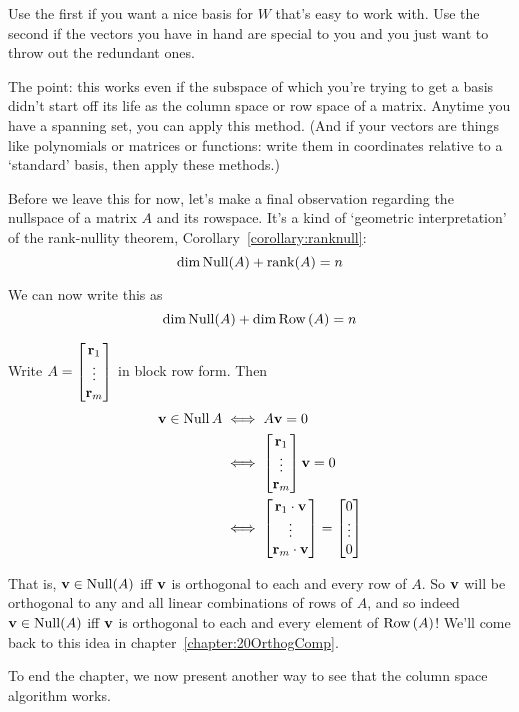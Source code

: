 Use the first
if you want a nice basis for $W$ that's easy to work with.
Use the second if the vectors you have in hand are special to you
and you just want to throw out the redundant ones.  

The point:  this works even if the subspace of which you're trying
to get a basis didn't start off its life as the column space or row space
of a matrix.  Anytime you have a spanning set, you can apply this
method.  (And if your vectors are things like polynomials or matrices
or functions:  write them in coordinates relative to a `standard'
basis, then apply these methods.)
\begin{remark}\label{NullperpRow}

Before we leave this for now, let's make a final observation regarding the nullspace of a matrix $A$ and its rowspace. It's a kind of `geometric interpretation' of the rank-nullity theorem, Corollary~\ref{corollary:ranknull}:
$$
\dim \operatorname{Null}(A)  + \operatorname{rank}(A) = n
$$

We can now write this as 
$$
\dim \operatorname{Null}(A)  + \dim \operatorname{Row\,}(A) = n
$$

Write $A=\bmatrix \rr_1\\\vdots \\ \rr_m\endbmatrix $ in block row form. Then
\begin{align*} \vv\in \Null A &\iff  A\vv=0\\
&\iff \bmatrix \rr_1\\\vdots \\ \rr_m\endbmatrix  \vv=0\\
&\iff \bmatrix \rr_1\cdot \vv\\\vdots \\ \rr_m\cdot \vv\endbmatrix = \bmatrix 0\\\vdots \\0\endbmatrix 
\end{align*}

That is, $\mathbf{v} \in \operatorname{Null}(A)$ iff $\mathbf{v}$ is orthogonal to each and every row of $A$. So $\mathbf{v}$ will be orthogonal to any and all linear combinations of rows of $A$, and so indeed $\mathbf{v} \in \operatorname{Null}(A)$ iff $\mathbf{v}$ is orthogonal to each and every element  of $\operatorname{Row\,}(A)$! We'll come back to this idea in chapter~\ref{chapter:20OrthogComp}.
\end{remark}

To end the chapter, we now present another way to see that the column space algorithm works.



